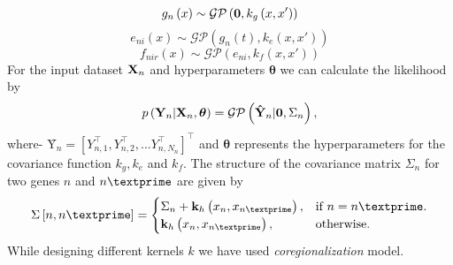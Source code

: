 \begin{equation} \label{eq:hGPn}
g_n\left(x\right) \sim \mathcal{GP} \left(\textbf 0,k_g\left(x,x' \right)\right)
\end{equation}
\begin{equation} \label{eq:hGPni}
e_{ni}\left(x\right) \sim \mathcal{GP} \left(g_n\left(t\right),k_e\left(x,x' \right)\right)
\end{equation}
\begin{equation} \label{eq:hGPnir}
f_{nir}\left(x\right) \sim \mathcal{GP} \left(e_{ni},k_f\left(x,x' \right)\right)
\end{equation}
For the input dataset ${\textbf X}_n$ and hyperparameters $\boldsymbol{\theta}$ we can calculate the 
likelihood by
\begin{equation} \label{eq:LikelihoodHGP}
p\left(\textbf{Y}_n | \textbf{X}_n, \boldsymbol{\theta}\right) = \mathcal{GP} \left(\textbf {\^{Y}}_n|\textbf 0, \Sigma_n\right),
\end{equation}
where-
$\textbf {\^{Y}}_n= {\left[Y_{n,1}^\top,Y_{n,2}^\top, ... Y_{n,N_n}^\top\right]}^\top$ and $\boldsymbol{\theta}$ represents the hyperparameters for the covariance function $k_g,k_e$ and $k_f$. The structure of the covariance matrix $\Sigma_n$ for two genes $n$ and $n\textprime$ are given by
\begin{equation}
  \Sigma\left[n,n\textprime\right]=\begin{cases}
    \Sigma_n+\textbf{k}_h\left(x_n,x_{n\textprime}\right), & \text{if $n=n\textprime$}.\\
    \textbf{k}_h\left(x_n,x_{n\textprime}\right), & \text{otherwise}.
  \end{cases}
\end{equation}
While designing different kernels $k$ we have used \emph{coregionalization} model. 

